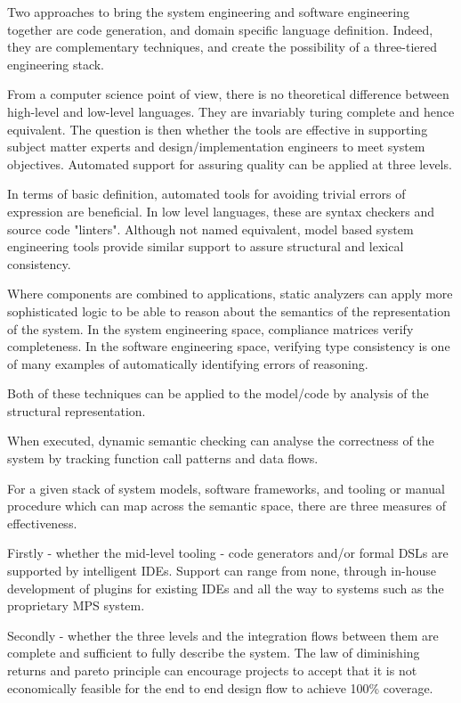 \documentclass[preprint,12pt]{elsarticle}
\begin{document}
Two approaches to bring the system engineering and software engineering
together are code generation, and domain specific language definition.
Indeed, they are complementary techniques, and create the possibility
of a three-tiered engineering stack.

From a computer science point of view, there is no theoretical difference
between high-level and low-level languages.  They are invariably
turing complete and hence equivalent. The question is then whether the
tools are effective in supporting subject matter experts and 
design/implementation engineers to meet system objectives.
Automated support for assuring quality can be applied at three
levels.

In terms of basic definition, automated tools for avoiding trivial errors of expression
are beneficial.  In low level languages, these are syntax checkers
and source code "linters".  Although not named equivalent, model
based system engineering tools provide similar support to assure
structural and lexical consistency.

Where components are combined to applications,
static analyzers can apply more sophisticated logic to
be able to reason about the semantics of the representation
of the system.  In the system engineering space, compliance 
matrices verify completeness.  In the software engineering
space, verifying type consistency is one of many examples
of automatically identifying errors of reasoning.

Both of these techniques can be applied to the model/code
by analysis of the structural representation.

When executed, dynamic semantic checking can analyse the 
correctness of the system by tracking function call
patterns and data flows.

For a given stack of system models, 
software frameworks, and tooling or manual procedure which
can map across the semantic space, there are three
measures of effectiveness.

Firstly - whether the mid-level tooling - code generators and/or formal
DSLs are supported by intelligent IDEs.  Support can range from none,
through in-house development of plugins for existing IDEs and all the
way to systems such as the proprietary MPS system.

Secondly - whether the three levels and the integration flows
between them are complete and sufficient to fully describe
the system.  The law of diminishing returns and pareto principle
can encourage projects to accept that it is not economically
feasible for the end to end design flow to achieve 100\%
coverage.
\end{document}
